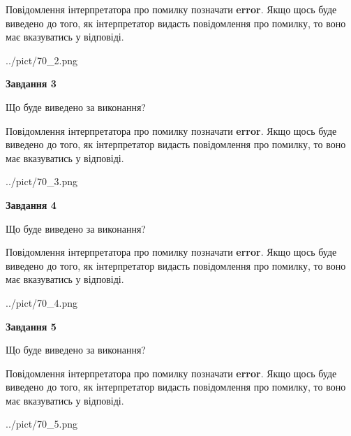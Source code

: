 \documentclass[12pt, ukrainian]{article}
\begin{document}
{\begin {large}
Повідомлення інтерпретатора про помилку позначати \textbf{error}.
Якщо щось буде виведено до того, як інтерпретатор видасть повідомлення про помилку, 
то воно має вказуватись у відповіді. \par


\begin{center}
	{../pict/70_2.png}
\end{center}
\newpage

{\begin {center}\textbf{Завдання 3}\end {center}}\par
Що буде виведено за виконання?

Повідомлення інтерпретатора про помилку позначати \textbf{error}.
Якщо щось буде виведено до того, як інтерпретатор видасть повідомлення про помилку, 
то воно має вказуватись у відповіді. \par


\begin{center}
	{../pict/70_3.png}
\end{center}
\newpage

{\begin {center}\textbf{Завдання 4}\end {center}}\par
Що буде виведено за виконання?

Повідомлення інтерпретатора про помилку позначати \textbf{error}.
Якщо щось буде виведено до того, як інтерпретатор видасть повідомлення про помилку, 
то воно має вказуватись у відповіді. \par


\begin{center}
	{../pict/70_4.png}
\end{center}
\newpage

{\begin {center}\textbf{Завдання 5}\end {center}}\par
Що буде виведено за виконання?

Повідомлення інтерпретатора про помилку позначати \textbf{error}.
Якщо щось буде виведено до того, як інтерпретатор видасть повідомлення про помилку, 
то воно має вказуватись у відповіді. \par


\begin{center}
	{../pict/70_5.png}
\end{center}
\newpage


\end{large}}
\end{document}

